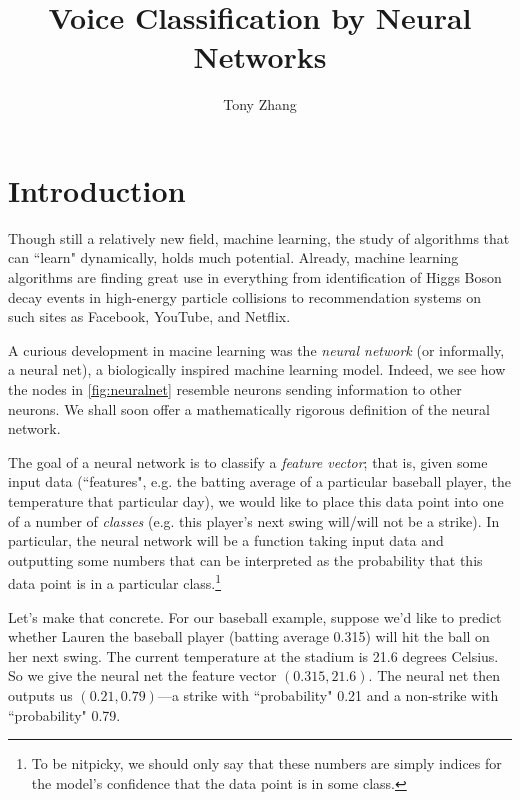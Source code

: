 \documentclass[10pt]{article}
\title{Voice Classification by Neural Networks}
\author{Tony Zhang}
\begin{document}
\maketitle

\begin{abstract}
% 
\end{abstract}

\section{Introduction}


Though still a relatively new field, machine learning, the study of algorithms that can ``learn" dynamically, holds much potential. Already, machine learning algorithms are finding great use in everything from identification of Higgs Boson decay events in high-energy particle collisions to recommendation systems on such sites as Facebook, YouTube, and Netflix.

A curious development in macine learning was the \emph{neural network} (or informally, a neural net), a biologically inspired machine learning model. Indeed, we see how the nodes in \cref{fig:neuralnet} resemble neurons sending information to other neurons. We shall soon offer a mathematically rigorous definition of the neural network.

The goal of a neural network is to classify a \emph{feature vector}; that is, given some input data (``features", e.g. the batting average of a particular baseball player, the temperature that particular day), we would like to place this data point into one of a number of \emph{classes} (e.g. this player's next swing will/will not be a strike). In particular, the neural network will be a function taking input data and outputting some numbers that can be interpreted as the probability that this data point is in a particular class.\footnote{To be nitpicky, we should only say that these numbers are simply indices for the model's confidence that the data point is in some class.}

Let's make that concrete. For our baseball example, suppose we'd like to predict whether Lauren the baseball player (batting average 0.315) will hit the ball on her next swing. The current temperature at the stadium is 21.6 degrees Celsius. So we give the neural net the feature vector $(0.315, 21.6)$. The neural net then outputs us $(0.21, 0.79)$---a strike with ``probability" 0.21 and a non-strike with ``probability" 0.79.
\end{document}
